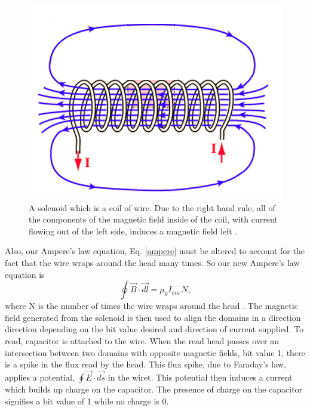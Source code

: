 \documentclass[ notitlepage, numerical, 11pt]{revtex4-1} %
\begin{document}
\begin{figure}[H]
\centerline{\includegraphics[scale=.55]{solenoid.png}}
\caption{A solenoid which is a coil of wire. Due to the right hand rule, all of the components of the magnetic field inside of the coil, with current flowing out of the left side, induces a magnetic field left \cite{hyperSolenoid}.}
\label{solenoid}
\end{figure}
Also, our Ampere's law equation, Eq. \ref{ampere} must be altered to account for the fact that the wire wraps around the head many times. So our new Ampere's law equation is
\begin{equation}
\oint \vec{B}\cdot \vec{dl} = \mu_0 I_{enc}N,
\label{ampere2}
\end{equation}
where N is the number of times the wire wraps around the head \cite{purcell}.
The magnetic field generated from the solenoid is then used to align the domains in a direction direction depending on the bit value desired and direction of current supplied. To read, capacitor is attached to the wire. When the read head passes over an intersection between two domains with opposite magnetic fields, bit value 1, there is a spike in the flux read by the head. This flux spike, due to Faraday's law, applies a potential, $\oint \vec{E}\cdot \vec{ds}$  in the wiret. This potential then induces a current which builds up charge on the capacitor. The presence of charge on the capacitor signifies a bit value of 1 while no charge is 0.
\end{document}
